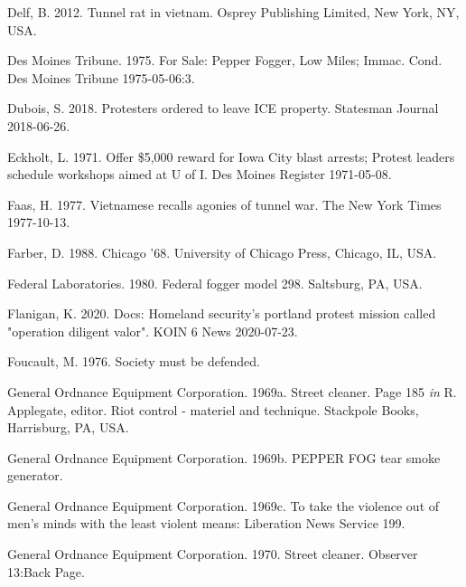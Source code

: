 \documentclass[
  11pt,
]{krantz}
\newlength{\cslhangindent}
\newlength{\cslentryspacingunit} %
\newenvironment{CSLReferences}[2] %
 {%
  \setlength{\parindent}{0pt}
  \ifodd #1
  \let\oldpar\par
  \def\par{\hangindent=\cslhangindent\oldpar}
  \fi
  \setlength{\parskip}{#2\cslentryspacingunit}
 }%
 {}
\begin{document}
\begin{CSLReferences}{1}{0}
\leavevmode{}%
Delf, B. 2012. Tunnel rat in vietnam. Osprey Publishing Limited, New York, NY, USA.

\leavevmode{}%
Des Moines Tribune. 1975. {For Sale: Pepper Fogger, Low Miles; Immac. Cond.} Des Moines Tribune 1975-05-06:3.

\leavevmode{}%
Dubois, S. 2018. Protesters ordered to leave ICE property. Statesman Journal 2018-06-26.

\leavevmode{}%
Eckholt, L. 1971. {Offer \$5,000 reward for Iowa City blast arrests; Protest leaders schedule workshops aimed at U of I}. Des Moines Register 1971-05-08.

\leavevmode{}%
Faas, H. 1977. Vietnamese recalls agonies of tunnel war. The New York Times 1977-10-13.

\leavevmode{}%
Farber, D. 1988. Chicago '68. University of Chicago Press, Chicago, IL, USA.

\leavevmode{}%
Federal Laboratories. 1980. Federal fogger model 298. Saltsburg, PA, USA.

\leavevmode{}%
Flanigan, K. 2020. Docs: Homeland security's portland protest mission called "operation diligent valor". KOIN 6 News 2020-07-23.

\leavevmode{}%
Foucault, M. 1976. Society must be defended.

\leavevmode{}%
General Ordnance Equipment Corporation. 1969a. Street cleaner. Page 185 \emph{in} R. Applegate, editor. Riot control - materiel and technique. Stackpole Books, Harrisburg, PA, USA.

\leavevmode{}%
General Ordnance Equipment Corporation. 1969b. PEPPER FOG tear smoke generator.

\leavevmode{}%
General Ordnance Equipment Corporation. 1969c. To take the violence out of men's minds with the least violent means: Liberation News Service 199.

\leavevmode{}%
General Ordnance Equipment Corporation. 1970. Street cleaner. Observer 13:Back Page.


\end{CSLReferences}
\end{document}
